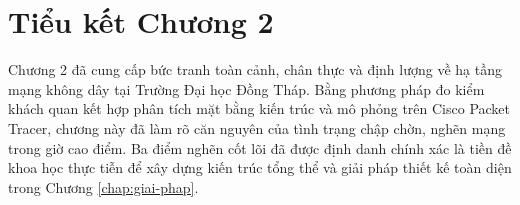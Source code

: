 \section{Tiểu kết Chương 2}

Chương 2 đã cung cấp bức tranh toàn cảnh, chân thực và định lượng về hạ tầng mạng không dây tại Trường Đại học Đồng Tháp. Bằng phương pháp đo kiểm khách quan kết hợp phân tích mặt bằng kiến trúc và mô phỏng trên Cisco Packet Tracer, chương này đã làm rõ căn nguyên của tình trạng chập chờn, nghẽn mạng trong giờ cao điểm. Ba điểm nghẽn cốt lõi đã được định danh chính xác là tiền đề khoa học thực tiễn để xây dựng kiến trúc tổng thể và giải pháp thiết kế toàn diện trong Chương \ref{chap:giai-phap}.
